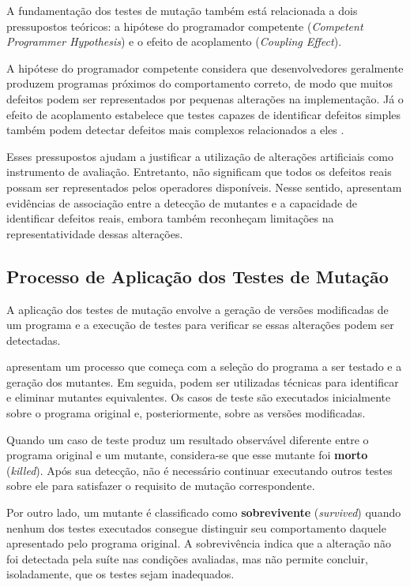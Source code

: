 A fundamentação dos testes de mutação também está relacionada a dois pressupostos teóricos: a hipótese do programador competente (\textit{Competent Programmer Hypothesis}) e o efeito de acoplamento (\textit{Coupling Effect}).

A hipótese do programador competente considera que desenvolvedores geralmente produzem programas próximos do comportamento correto, de modo que muitos defeitos podem ser representados por pequenas alterações na implementação. Já o efeito de acoplamento estabelece que testes capazes de identificar defeitos simples também podem detectar defeitos mais complexos relacionados a eles \cite{ammann2016}.

Esses pressupostos ajudam a justificar a utilização de alterações artificiais como instrumento de avaliação. Entretanto, não significam que todos os defeitos reais possam ser representados pelos operadores disponíveis. Nesse sentido,  apresentam evidências de associação entre a detecção de mutantes e a capacidade de identificar defeitos reais, embora também reconheçam limitações na representatividade dessas alterações.

\subsection{Processo de Aplicação dos Testes de Mutação}

A aplicação dos testes de mutação envolve a geração de versões modificadas de um programa e a execução de testes para verificar se essas alterações podem ser detectadas.

 apresentam um processo que começa com a seleção do programa a ser testado e a geração dos mutantes. Em seguida, podem ser utilizadas técnicas para identificar e eliminar mutantes equivalentes. Os casos de teste são executados inicialmente sobre o programa original e, posteriormente, sobre as versões modificadas.

Quando um caso de teste produz um resultado observável diferente entre o programa original e um mutante, considera-se que esse mutante foi \textbf{morto} (\textit{killed}). Após sua detecção, não é necessário continuar executando outros testes sobre ele para satisfazer o requisito de mutação correspondente.

Por outro lado, um mutante é classificado como \textbf{sobrevivente} (\textit{survived}) quando nenhum dos testes executados consegue distinguir seu comportamento daquele apresentado pelo programa original. A sobrevivência indica que a alteração não foi detectada pela suíte nas condições avaliadas, mas não permite concluir, isoladamente, que os testes sejam inadequados.

